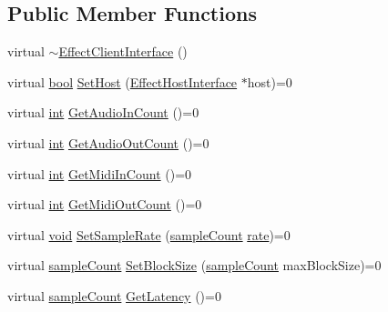 \subsection*{Public Member Functions}
\begin{DoxyCompactItemize}
\item 
virtual \hyperlink{class_effect_client_interface_a49d96ba61ec00a953abe054afb7e7e9f}{$\sim$\+Effect\+Client\+Interface} ()
\item 
virtual \hyperlink{mac_2config_2i386_2lib-src_2libsoxr_2soxr-config_8h_abb452686968e48b67397da5f97445f5b}{bool} \hyperlink{class_effect_client_interface_a9a32c2179acba161371eac98f0a2eaf5}{Set\+Host} (\hyperlink{class_effect_host_interface}{Effect\+Host\+Interface} $\ast$host)=0
\item 
virtual \hyperlink{xmltok_8h_a5a0d4a5641ce434f1d23533f2b2e6653}{int} \hyperlink{class_effect_client_interface_a3c7a27133bd57b29d0747f60b5dcda35}{Get\+Audio\+In\+Count} ()=0
\item 
virtual \hyperlink{xmltok_8h_a5a0d4a5641ce434f1d23533f2b2e6653}{int} \hyperlink{class_effect_client_interface_ae7109866cea08f45e1be7d91e4b5dde3}{Get\+Audio\+Out\+Count} ()=0
\item 
virtual \hyperlink{xmltok_8h_a5a0d4a5641ce434f1d23533f2b2e6653}{int} \hyperlink{class_effect_client_interface_a3456e1b709d539d6cc15a8ba9e7e475e}{Get\+Midi\+In\+Count} ()=0
\item 
virtual \hyperlink{xmltok_8h_a5a0d4a5641ce434f1d23533f2b2e6653}{int} \hyperlink{class_effect_client_interface_a0660e057201fbfefdda4e7ad8c691b94}{Get\+Midi\+Out\+Count} ()=0
\item 
virtual \hyperlink{sound_8c_ae35f5844602719cf66324f4de2a658b3}{void} \hyperlink{class_effect_client_interface_a17c2aa1ca1d52663ce029f8ec3459766}{Set\+Sample\+Rate} (\hyperlink{include_2audacity_2_types_8h_afa427e1f521ea5ec12d054e8bd4d0f71}{sample\+Count} \hyperlink{seqread_8c_ad89d3fac2deab7a9cf6cfc8d15341b85}{rate})=0
\item 
virtual \hyperlink{include_2audacity_2_types_8h_afa427e1f521ea5ec12d054e8bd4d0f71}{sample\+Count} \hyperlink{class_effect_client_interface_adccf79796cdc60185a19ccac22caf876}{Set\+Block\+Size} (\hyperlink{include_2audacity_2_types_8h_afa427e1f521ea5ec12d054e8bd4d0f71}{sample\+Count} max\+Block\+Size)=0
\item 
virtual \hyperlink{include_2audacity_2_types_8h_afa427e1f521ea5ec12d054e8bd4d0f71}{sample\+Count} \hyperlink{class_effect_client_interface_a34ced6d90cc15569f6195a23cc93ffca}{Get\+Latency} ()=0
\item 

\end{DoxyCompactItemize}
